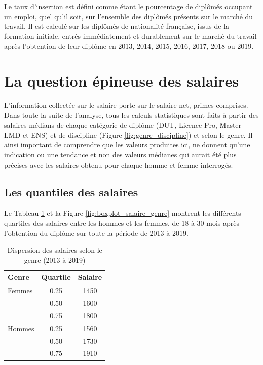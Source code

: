 \documentclass[12pt, a4paper, titlepage, table]{article}
\begin{document}
Le taux d’insertion est défini comme étant le pourcentage de diplômés occupant un emploi, quel qu’il soit, sur l’ensemble des diplômés présents sur le marché du travail. Il est calculé sur les diplômés de nationalité française, issus de la formation initiale, entrés immédiatement et durablement sur le marché du travail après l’obtention de leur diplôme en 2013, 2014, 2015, 2016, 2017, 2018 ou 2019.


\section{La question épineuse des salaires}
L’information collectée sur le salaire porte sur le salaire net, primes comprises. Dans toute la suite de l'analyse, tous les calculs statistiques sont faits à partir des salaires médians de chaque catégorie de diplôme (DUT, Licence Pro, Master LMD et ENS) et de discipline (Figure \ref{fig:genre_discipline}) et selon le genre. Il ainsi important de comprendre que les valeurs produites ici,  ne donnent qu'une indication ou une tendance et non des valeurs médianes qui aurait été plus précises avec les salaires obtenu pour chaque homme et femme interrogés.
 

	\subsection{Les quantiles des salaires}	
	Le Tableau \ref{tab:quartile_salaire_genre} et la Figure \ref{fig:boxplot_salaire_genre} montrent les différents quartiles des salaires entre les hommes et les femmes, de 18 à 30 mois après l'obtention du diplôme sur toute la période de 2013 à 2019.
	
	\begin{table}[H]
		\centering
		\begin{tabular}{lcc}
			\toprule
			\textbf{Genre} & \textbf{Quartile} & \textbf{Salaire} \\
			\midrule
			Femmes & 0.25 & 1450 \\
			& 0.50 & 1600 \\
			& 0.75 & 1800 \\
			\midrule
			Hommes & 0.25 & 1560 \\
			& 0.50 & 1730 \\
			& 0.75 & 1910 \\
			\bottomrule
		\end{tabular}
		\caption{Dispersion des salaires selon le genre (2013 à 2019)}
		\label{tab:quartile_salaire_genre}
	\end{table}
	
\end{document}
